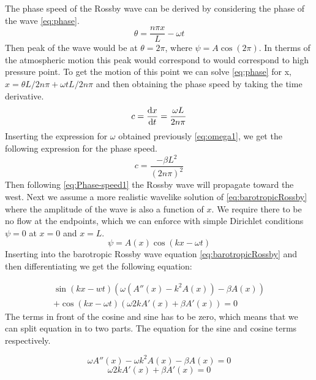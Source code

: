 The phase speed of the Rossby wave can be derived by considering the phase of
the wave \cref{eq:phase}.
\begin{equation}\label{eq:phase}
    \theta = \frac{n \pi x}{L} - \omega t
\end{equation} 
Then peak of the wave would be at $\theta = 2\pi$, where $\psi = A\cos{(2\pi)}$.
In therms of the atmospheric motion this peak would correspond to would
correspond to high pressure point. To get the motion of this point we can solve
\cref{eq:phase} for x, $x=\theta L / 2n \pi + \omega t L / 2n \pi$ and then
obtaining the phase speed by taking the time derivative. 
\begin{equation}
    c = \dv{x}{t} = \frac{\omega L}{2n\pi}
\end{equation} 
Inserting the expression for $\omega$ obtained previously \cref{eq:omega1}, we
get the following expression for the phase speed.
\begin{equation}\label{eq:Phase-speed1}
    c = \frac{-\beta L^2}{(2n\pi)^2}
\end{equation}
Then following \cref{eq:Phase-speed1} the Rossby wave will propagate 
toward the west.  
Next we assume a more realistic wavelike solution of \cref{eq:barotropicRossby}
where the amplitude of the wave is also a function of $x$. We
require there to be no flow at the endpoints, which we can enforce with simple
Dirichlet conditions $\psi= 0$ at $x=0$ and $x=L$.
\begin{equation}\label{eq:waveSolution2}
    \psi = A(x)\cos{(kx-\omega t)} 
\end{equation}  
Inserting \label{eq:waveSolution2} into the barotropic Rossby wave equation
\cref{eq:barotropicRossby} and then differentiating we get the following
equation:

\begin{equation}\label{eq:step1}
    \begin{split}
    \sin{(kx-wt)\left(\omega(A''(x)-k^2A(x))- \beta A(x)\right)} \\
    + \cos{(kx - \omega t)}\left(\omega 2kA'(x) +\beta A'(x)\right) = 0
    \end{split}
\end{equation}
The terms in front of the cosine and sine has to be zero, which means that we
can split equation in to two parts. The equation for the sine and cosine terms 
respectively.  

\begin{equation}\label{eq:sine-terms}
    \omega A''(x) -\omega k^2 A(x) - \beta A(x) = 0
\end{equation}
\begin{equation}\label{eq:cos-terms}
    \omega 2 k A'(x) + \beta A'(x) = 0
\end{equation} 


